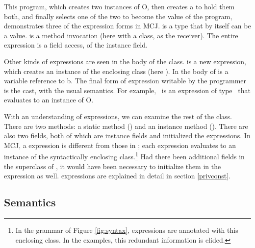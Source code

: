 \documentclass[10pt]{acm-sigplan}
\begin{document}
This program, which creates two instances of {\txt O}, then creates a
{} to hold them both, and finally selects one of the two to
become the value of the program, demonstrates three of the expression
forms in MCJ.  {} is a type that by itself can be a
value.  {} is a method invocation (here with a class, as
the receiver).  The entire expression is a field access, of the
{} instance field.

Other kinds of expressions are seen in the body of the {}
class.  {} is a new expression, which creates an
instance of the enclosing class (here {}).  In the body of
{} is a variable reference to {\txt b}.  The final form of
expression writable by the programmer is the cast, with the usual
semantics. For example, {}\ is an expression of
type \Object\ that evaluates to an instance of {\txt O}.

With an understanding of expressions, we can examine the rest of the
{} class.  There are two methods: a static method
({}) and an instance method ({}).  There are
also two fields, both of which are instance fields and initialized the
{} expressions. In MCJ, a {} expression is different
from those in \FGJ; each {} expression evaluates to an
instance of the syntactically enclosing class.\footnote{In the grammar
of Figure \ref{fig:syntax}, {} expressions are annotated with
this enclosing class.  In the examples, this redundant information is
elided.}  Had there been additional fields in the superclass of
{}, it would have been necessary to initialize them in the
{} expression as well. {} expressions are explained
in detail in section \ref{privconst}.


\subsection{Semantics}
\label{formalsem}
\end{document}
